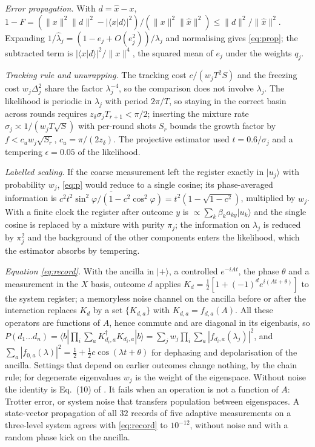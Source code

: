 \documentclass[journal]{IEEEtran}
\begin{document}
\emph{Error propagation.} With $d=\hat x-x$, $1-F=(\|x\|^2\|d\|^2-|\langle x|d\rangle|^2)/(\|x\|^2\|\hat x\|^2)\le\|d\|^2/\|\hat x\|^2$. Expanding $1/\hat\lambda_j=(1-e_j+O(e_j^2))/\lambda_j$ and normalising gives \eqref{eq:prop}; the subtracted term is $|\langle x|d\rangle|^2/\|x\|^4$, the squared mean of $e_j$ under the weights $q_j$.

\emph{Tracking rule and unwrapping.} The tracking cost $c/(w_jT^2S)$ and the freezing cost $w_j\Delta_j^2$ share the factor $\lambda_j^{-4}$, so the comparison does not involve $\lambda_j$. The likelihood is periodic in $\lambda_j$ with period $2\pi/T$, so staying in the correct basin across rounds requires $z_\delta\sigma_jT_{r+1}<\pi/2$; inserting the mixture rate $\sigma_j\asymp1/(w_jT\sqrt S)$ with per-round shots $S_r$ bounds the growth factor by $f<c_uw_j\sqrt{S_r}$, $c_u=\pi/(2z_\delta)$. The projective estimator used $t=0.6/\sigma_j$ and a tempering $\epsilon=0.05$ of the likelihood.

\emph{Labelled scaling.} If the coarse measurement left the register exactly in $|u_j\rangle$ with probability $w_j$, \eqref{eq:p} would reduce to a single cosine; its phase-averaged information is $\overline{c^2t^2\sin^2\varphi/(1-c^2\cos^2\varphi)}=t^2(1-\sqrt{1-c^2})$, multiplied by $w_j$. With a finite clock the register after outcome $y$ is $\propto\sum_k\beta_ka_{ky}|u_k\rangle$ and the single cosine is replaced by a mixture with purity $\pi_j$; the information on $\lambda_j$ is reduced by $\pi_j^2$ and the background of the other components enters the likelihood, which the estimator absorbs by tempering.

\emph{Equation \eqref{eq:record}.} With the ancilla in $|+\rangle$, a controlled $e^{-iAt}$, the phase $\theta$ and a measurement in the $X$ basis, outcome $d$ applies $K_d=\tfrac12[1+(-1)^de^{i(At+\theta)}]$ to the system register; a memoryless noise channel on the ancilla before or after the interaction replaces $K_d$ by a set $\{K_{d,a}\}$ with $K_{d,a}=f_{d,a}(A)$. All these operators are functions of $A$, hence commute and are diagonal in its eigenbasis, so $P(d_1\dots d_n)=\langle b|\prod_i\sum_aK_{d_i,a}^\dagger K_{d_i,a}|b\rangle=\sum_jw_j\prod_i\sum_a|f_{d_i,a}(\lambda_j)|^2$, and $\sum_a|f_{0,a}(\lambda)|^2=\tfrac12+\tfrac12c\cos(\lambda t+\theta)$ for dephasing and depolarisation of the ancilla. Settings that depend on earlier outcomes change nothing, by the chain rule; for degenerate eigenvalues $w_j$ is the weight of the eigenspace. Without noise the identity is Eq.~(10) of \cite{OBrien2019}. It fails when an operation is not a function of $A$: Trotter error, or system noise that transfers population between eigenspaces. A state-vector propagation of all $32$ records of five adaptive measurements on a three-level system agrees with \eqref{eq:record} to $10^{-12}$, without noise and with a random phase kick on the ancilla.
\end{document}

